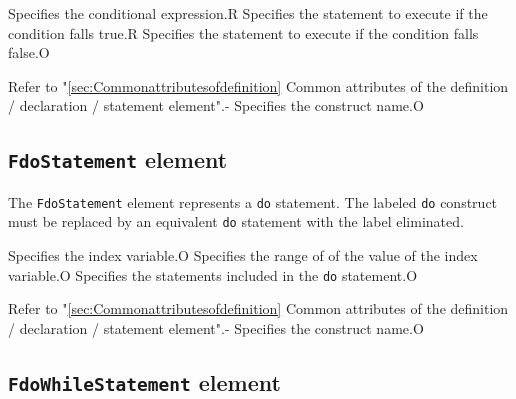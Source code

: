 \begin{XcodeMLChildElements}
{Specifies the conditional expression.}{R}
{Specifies the statement to execute if the condition falls true.}{R}
{Specifies the statement to execute if the condition falls false.}{O}
\end{XcodeMLChildElements}

\begin{XcodeMLAttributes}
{Refer to "\ref{sec:Commonattributesofdefinition} Common attributes of the definition / declaration / statement element".}{-}
{Specifies the construct name.}{O}
\end{XcodeMLAttributes}


\subsection{ {\tt FdoStatement} element}

The {\tt FdoStatement} element represents a {\tt do} statement.
The labeled {\tt do} construct must be replaced by an equivalent {\tt do} statement with the label eliminated.


\begin{XcodeMLChildElements}
{Specifies the index variable.}{O}
{Specifies the range of of the value of the index variable.}{O}
{Specifies the statements included in the {\tt do} statement.}{O}
\end{XcodeMLChildElements}

\begin{XcodeMLAttributes}
{Refer to "\ref{sec:Commonattributesofdefinition} Common attributes of the definition / declaration / statement element".}{-}
{Specifies the construct name.}{O}
\end{XcodeMLAttributes}


\subsection{ {\tt FdoWhileStatement} element}

